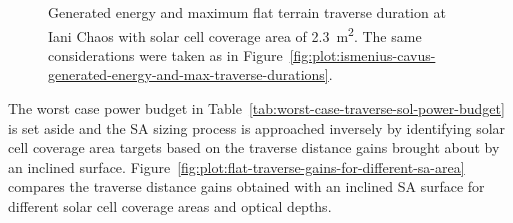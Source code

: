 \documentclass[twocolumn,letterpaper]{IEEEAerospaceCLS}  %
\newcommand{\refFig}[1]{{Figure}~\ref{#1}} %
\newcommand{\refTab}[1]{{Table}~\ref{#1}}  %
\newlength{\subfigureWidth}
\begin{document}
\begin{figure}[h]
\begin{subfigure}[t]{\subfigureWidth}
    \label{fig:plot:sub:iani-chaos-max-traverse-durations}
  \end{subfigure}
  \caption{Generated energy and maximum flat terrain traverse duration at Iani Chaos with solar cell coverage area of \SI{2.3}{m^{2}}. The same considerations were taken as in \refFig{fig:plot:ismenius-cavus-generated-energy-and-max-traverse-durations}.}
  \label{fig:plot:iani-chaos-generated-energy-and-max-traverse-durations}
\end{figure}

The worst case power budget in \refTab{tab:worst-case-traverse-sol-power-budget} is set aside and the \ac{SA} sizing process is approached inversely by identifying solar cell coverage area targets based on the traverse distance gains brought about by an inclined surface. \refFig{fig:plot:flat-traverse-gains-for-different-sa-area} compares the traverse distance gains obtained with an inclined \ac{SA} surface for different solar cell coverage areas and optical depths.
\end{document}
